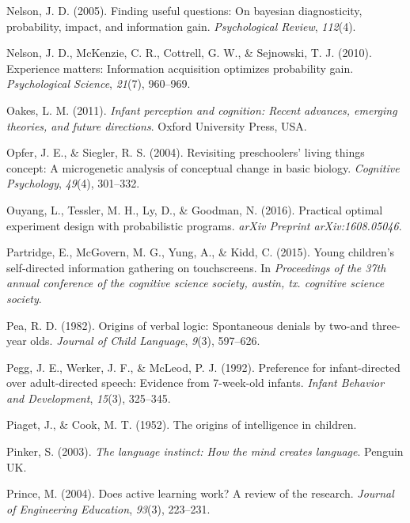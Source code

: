\documentclass[oneside]{report}
\begin{document}
\hypertarget{ref-nelson2005finding}{}
Nelson, J. D. (2005). Finding useful questions: On bayesian
diagnosticity, probability, impact, and information gain.
\emph{Psychological Review}, \emph{112}(4).

\hypertarget{ref-nelson2010experience}{}
Nelson, J. D., McKenzie, C. R., Cottrell, G. W., \& Sejnowski, T. J.
(2010). Experience matters: Information acquisition optimizes
probability gain. \emph{Psychological Science}, \emph{21}(7), 960--969.

\hypertarget{ref-oakes2011infant}{}
Oakes, L. M. (2011). \emph{Infant perception and cognition: Recent
advances, emerging theories, and future directions}. Oxford University
Press, USA.

\hypertarget{ref-opfer2004revisiting}{}
Opfer, J. E., \& Siegler, R. S. (2004). Revisiting preschoolers' living
things concept: A microgenetic analysis of conceptual change in basic
biology. \emph{Cognitive Psychology}, \emph{49}(4), 301--332.

\hypertarget{ref-ouyang2016practical}{}
Ouyang, L., Tessler, M. H., Ly, D., \& Goodman, N. (2016). Practical
optimal experiment design with probabilistic programs. \emph{arXiv
Preprint arXiv:1608.05046}.

\hypertarget{ref-partridge2015young}{}
Partridge, E., McGovern, M. G., Yung, A., \& Kidd, C. (2015). Young
children's self-directed information gathering on touchscreens. In
\emph{Proceedings of the 37th annual conference of the cognitive science
society, austin, tx. cognitive science society}.

\hypertarget{ref-pea1982origins}{}
Pea, R. D. (1982). Origins of verbal logic: Spontaneous denials by
two-and three-year olds. \emph{Journal of Child Language}, \emph{9}(3),
597--626.

\hypertarget{ref-pegg1992preference}{}
Pegg, J. E., Werker, J. F., \& McLeod, P. J. (1992). Preference for
infant-directed over adult-directed speech: Evidence from 7-week-old
infants. \emph{Infant Behavior and Development}, \emph{15}(3), 325--345.

\hypertarget{ref-piaget1952origins}{}
Piaget, J., \& Cook, M. T. (1952). The origins of intelligence in
children.

\hypertarget{ref-pinker2003language}{}
Pinker, S. (2003). \emph{The language instinct: How the mind creates
language}. Penguin UK.

\hypertarget{ref-prince2004does}{}
Prince, M. (2004). Does active learning work? A review of the research.
\emph{Journal of Engineering Education}, \emph{93}(3), 223--231.
\end{document}
